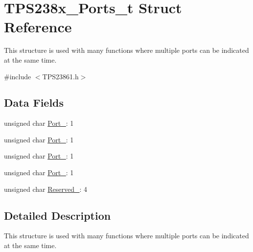 \hypertarget{struct_t_p_s238x___ports__t}{\section{T\-P\-S238x\-\_\-\-Ports\-\_\-t Struct Reference}
\label{struct_t_p_s238x___ports__t}
}


This structure is used with many functions where multiple ports can be indicated at the same time.  




{\ttfamily \#include $<$T\-P\-S23861.\-h$>$}

\subsection*{Data Fields}
\begin{DoxyCompactItemize}
\item 
unsigned char \hyperlink{struct_t_p_s238x___ports__t_ab93d3ac7c0e32d65c779922584ee852d}{Port\-\_}\-: 1
\item 
unsigned char \hyperlink{struct_t_p_s238x___ports__t_aa11042d2e7681c66717400b79001b6da}{Port\-\_}\-: 1
\item 
unsigned char \hyperlink{struct_t_p_s238x___ports__t_a047de2b5245cf8e987eea9f6fc03007d}{Port\-\_}\-: 1
\item 
unsigned char \hyperlink{struct_t_p_s238x___ports__t_a0bb3fb7e7c66a19930bc41304fa1c5df}{Port\-\_}\-: 1
\item 
unsigned char \hyperlink{struct_t_p_s238x___ports__t_a3c69d98f3fff7c88f0c910f33dea57e6}{Reserved\-\_}\-: 4
\end{DoxyCompactItemize}


\subsection{Detailed Description}
This structure is used with many functions where multiple ports can be indicated at the same time. 

